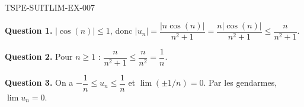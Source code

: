 \begin{corrige}{TSPE-SUITLIM-EX-007}

\textbf{Question 1.} $|\cos(n)| \leq 1$, donc $|u_n| = \dfrac{|n\cos(n)|}{n^2+1} = \dfrac{n|\cos(n)|}{n^2+1} \leq \dfrac{n}{n^2+1}$.

\textbf{Question 2.} Pour $n \geq 1$ : $\dfrac{n}{n^2+1} \leq \dfrac{n}{n^2} = \dfrac{1}{n}$.


\textbf{Question 3.} On a $-\dfrac{1}{n} \leq u_n \leq \dfrac{1}{n}$ et $\lim(\pm 1/n) = 0$. Par les gendarmes, $\boxed{\lim u_n = 0}$.

\end{corrige}
